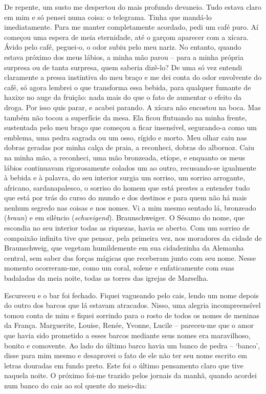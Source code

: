 De repente, um susto me despertou do mais profundo devaneio. Tudo estava
claro em mim e só pensei numa coisa: o telegrama. Tinha que mandá-lo
imediatamente. Para me manter completamente acordado, pedi um café puro.
Aí começou uma espera de meia eternidade, até o garçom aparecer com a
xícara. Ávido pelo café, peguei-o, o odor subiu pelo meu nariz. No
entanto, quando estava próximo dos meus lábios, a minha mão parou --
para a minha própria surpresa ou de tanta surpresa, quem saberia
dizê-lo? De uma só vez entendi claramente a pressa instintiva do meu
braço e me dei conta do odor envolvente do café, só agora lembrei o que
transforma essa bebida, para qualquer fumante de haxixe no auge da
fruição: nada mais do que o fato de aumentar o efeito da droga. Por isso
quis parar, e acabei parando. A xícara não encostou na boca. Mas também
não tocou a superfície da mesa. Ela ficou flutuando na minha frente,
sustentada pelo meu braço que começou a ficar insensível, segurando-a
como um emblema, uma pedra sagrada ou um osso, rígido e morto. Meu olhar
caiu nas dobras geradas por minha calça de praia, a reconheci, dobras do
albornoz. Caiu na minha mão, a reconheci, uma mão bronzeada, etíope, e
enquanto os meus lábios continuavam rigorosamente colados um ao outro,
recusando-se igualmente à bebida e à palavra, do seu interior surgia um
sorriso, um sorriso arrogante, africano, sardanapalesco, o sorriso do
homem que está prestes a entender tudo que está por trás do curso do
mundo e dos destinos e para quem não há mais nenhum segredo nas coisas e
nos nomes. Vi a mim mesmo sentado lá, bronzeado (\emph{braun}) e em
silêncio (\emph{schweigend}). Braunschweiger. O Sésamo do nome, que
escondia no seu interior todas as riquezas, havia se aberto. Com um
sorriso de compaixão infinita tive que pensar, pela primeira vez, nos
moradores da cidade de Braunschweig, que vegetam humildemente em sua
cidadezinha da Alemanha central, sem saber das forças mágicas que
receberam junto com seu nome. Nesse momento ocorreram-me, como um coral,
solene e enfaticamente com suas badaladas da meia noite, todas as torres
das igrejas de Marselha.

Escureceu e o bar foi fechado. Fiquei vagueando pelo cais, lendo um nome
depois do outro dos barcos que lá estavam atracados. Nisso, uma alegria
incompreensível tomou conta de mim e fiquei sorrindo para o rosto de
todos os nomes de meninas da França. Marguerite, Louise, Renée, Yvonne,
Lucile -- pareceu-me que o amor que havia sido prometido a esses barcos
mediante seus nomes era maravilhoso, bonito e comovente. Ao lado do
último barco havia um banco de pedra -- `banco', disse para mim mesmo e
desaprovei o fato de ele não ter seu nome escrito em letras douradas em
fundo preto. Este foi o último pensamento claro que tive naquela noite.
O próximo foi-me trazido pelos jornais da manhã, quando acordei num
banco do cais ao sol quente do meio-dia:

